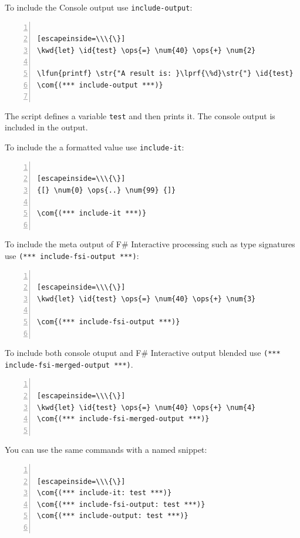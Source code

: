 \documentclass{article}
\newcommand{\id}[1]{\textcolor{black}{#1}}
\newcommand{\com}[1]{\textcolor{officegreen}{#1}}
\newcommand{\kwd}[1]{\textcolor{navy}{#1}}
\newcommand{\num}[1]{\textcolor{officegreen}{#1}}
\newcommand{\ops}[1]{\textcolor{purple}{#1}}
\newcommand{\str}[1]{\textcolor{olive}{#1}}
\begin{document}
To include the Console output use \texttt{include-output}:
\begin{lstlisting}[numbers=left]

[escapeinside=\\\{\}]
\kwd{let} \id{test} \ops{=} \num{40} \ops{+} \num{2}

\lfun{printf} \str{"A result is: }\lprf{\%d}\str{"} \id{test}
\com{(*** include-output ***)}


\end{lstlisting}



The script defines a variable \texttt{test} and then prints it. The console output is included
in the output.


To include the a formatted value use \texttt{include-it}:
\begin{lstlisting}[numbers=left]

[escapeinside=\\\{\}]
{[} \num{0} \ops{..} \num{99} {]}

\com{(*** include-it ***)}


\end{lstlisting}



To include the meta output of F\# Interactive processing such as type signatures use \texttt{(*** include-fsi-output ***)}:
\begin{lstlisting}[numbers=left]

[escapeinside=\\\{\}]
\kwd{let} \id{test} \ops{=} \num{40} \ops{+} \num{3}

\com{(*** include-fsi-output ***)}


\end{lstlisting}



To include both console otuput and F\# Interactive output blended use \texttt{(*** include-fsi-merged-output ***)}.
\begin{lstlisting}[numbers=left]

[escapeinside=\\\{\}]
\kwd{let} \id{test} \ops{=} \num{40} \ops{+} \num{4}
\com{(*** include-fsi-merged-output ***)}


\end{lstlisting}



You can use the same commands with a named snippet:
\begin{lstlisting}[numbers=left]

[escapeinside=\\\{\}]
\com{(*** include-it: test ***)}
\com{(*** include-fsi-output: test ***)}
\com{(*** include-output: test ***)}


\end{lstlisting}
\end{document}
